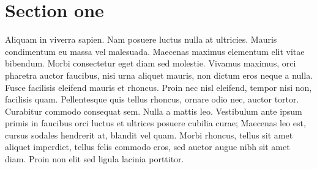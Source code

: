 \chapter{Section one}

Aliquam in viverra sapien. Nam posuere luctus nulla at ultricies. Mauris condimentum eu massa vel malesuada. Maecenas maximus elementum elit vitae bibendum. Morbi consectetur eget diam sed molestie. Vivamus maximus, orci pharetra auctor faucibus, nisi urna aliquet mauris, non dictum eros neque a nulla. Fusce facilisis eleifend mauris et rhoncus. Proin nec nisl eleifend, tempor nisi non, facilisis quam. Pellentesque quis tellus rhoncus, ornare odio nec, auctor tortor. Curabitur commodo consequat sem. Nulla a mattis leo. Vestibulum ante ipsum primis in faucibus orci luctus et ultrices posuere cubilia curae; Maecenas leo est, cursus sodales hendrerit at, blandit vel quam. Morbi rhoncus, tellus sit amet aliquet imperdiet, tellus felis commodo eros, sed auctor augue nibh sit amet diam. Proin non elit sed ligula lacinia porttitor.